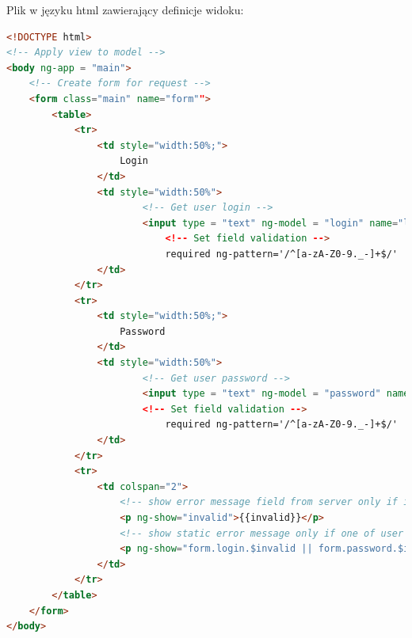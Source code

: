 \documentclass[12pt]{report}
\begin{document}
Plik w języku html zawierający definicje widoku:
\begin{lstlisting}[language=HTML]
<!DOCTYPE html> 
<!-- Apply view to model -->
<body ng-app = "main">
	<!-- Create form for request -->
	<form class="main" name="form""> 
		<table>
			<tr>
				<td style="width:50%;">
					Login
				</td>
				<td style="width:50%">
						<!-- Get user login -->
						<input type = "text" ng-model = "login" name="login"
							<!-- Set field validation -->
							required ng-pattern='/^[a-zA-Z0-9._-]+$/'  ng-maxlength="20" ng-minlength="3">
				</td>
			</tr>
			<tr>
				<td style="width:50%;">
					Password
				</td>
				<td style="width:50%">
						<!-- Get user password -->
						<input type = "text" ng-model = "password" name="password"
						<!-- Set field validation -->
							required ng-pattern='/^[a-zA-Z0-9._-]+$/'  ng-maxlength="20" ng-minlength="3">
				</td>
			</tr>
			<tr>
				<td colspan="2">
					<!-- show error message field from server only if invalid field exist -->
					<p ng-show="invalid">{{invalid}}</p>
					<!-- show static error message only if one of user field are invalid -->
					<p ng-show="form.login.$invalid || form.password.$invalid">Invalid login or password</p>
				</td>	
			</tr>
		</table>
	</form>
</body>
\end{lstlisting}
\end{document}
